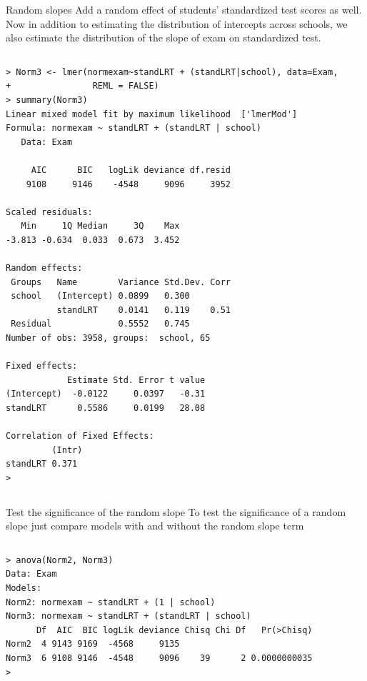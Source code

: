 \documentclass[table,smaller]{beamer}
\begin{document}
\begin{frame}[fragile,label=sec-5-6]{Random slopes}
 Add a random effect of students' standardized test scores as well. Now in addition to estimating the distribution of intercepts across schools, we also estimate the distribution of the slope of exam on standardized test.

\vspace{-.5em}
\begin{columns}
\begin{block}{}
\begin{verbatim}
> Norm3 <- lmer(normexam~standLRT + (standLRT|school), data=Exam,
+                REML = FALSE) 
> summary(Norm3) 
Linear mixed model fit by maximum likelihood  ['lmerMod']
Formula: normexam ~ standLRT + (standLRT | school)
   Data: Exam

     AIC      BIC   logLik deviance df.resid 
    9108     9146    -4548     9096     3952 

Scaled residuals: 
   Min     1Q Median     3Q    Max 
-3.813 -0.634  0.033  0.673  3.452 

Random effects:
 Groups   Name        Variance Std.Dev. Corr
 school   (Intercept) 0.0899   0.300        
          standLRT    0.0141   0.119    0.51
 Residual             0.5552   0.745        
Number of obs: 3958, groups:  school, 65

Fixed effects:
            Estimate Std. Error t value
(Intercept)  -0.0122     0.0397   -0.31
standLRT      0.5586     0.0199   28.08

Correlation of Fixed Effects:
         (Intr)
standLRT 0.371 
>
\end{verbatim}
\end{block}
\end{columns}
\vspace{.5em}
\end{frame}

\begin{frame}[fragile,label=sec-5-7]{Test the significance of the random slope}
 To test the significance of a random slope just compare models with and without the random slope term 

\vspace{-.5em}
\begin{columns}
\begin{block}{}
\begin{verbatim}
> anova(Norm2, Norm3) 
Data: Exam
Models:
Norm2: normexam ~ standLRT + (1 | school)
Norm3: normexam ~ standLRT + (standLRT | school)
      Df  AIC  BIC logLik deviance Chisq Chi Df   Pr(>Chisq)
Norm2  4 9143 9169  -4568     9135                          
Norm3  6 9108 9146  -4548     9096    39      2 0.0000000035
>
\end{verbatim}
\end{block}
\end{columns}
\vspace{.5em}
\end{frame}
\end{document}
